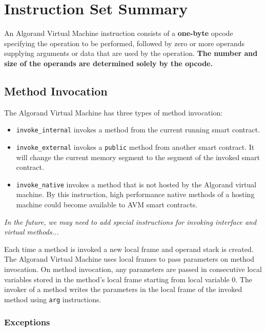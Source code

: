 \documentclass[11pt, A4]{report}
\begin{document}
    \section{Instruction Set Summary}\label{subsec:instruction-set-summary}

    An Algorand Virtual Machine instruction consists of a \textbf{one-byte} opcode specifying the operation to be
    performed, followed by zero or more operands supplying arguments or data that are used by the operation.
    \textbf{The number and size of the operands are determined solely by the opcode.}

    \subsection{Method Invocation}\label{subsec:method-invocation}

    The Algorand Virtual Machine has three types of method invocation:
    \begin{itemize}
        \item \texttt{invoke\_internal} invokes a method from the current running smart contract.
        \item \texttt{invoke\_external} invokes a \texttt{public} method from another smart contract. It will change
        the current memory segment to the segment of the invoked smart contract.
        \item \texttt{invoke\_native} invokes a method that is not hosted by the Algorand virtual machine. By this
        instruction, high performance native methods of a hosting machine could become available to AVM smart contracts.
    \end{itemize}

    \emph{In the future, we may need to add special instructions for invoking interface and virtual methods...}

    Each time a method is invoked a new local frame and operand stack is created. The Algorand Virtual Machine uses
    local frames to pass parameters on method invocation. On method invocation, any parameters are passed in
    consecutive local variables stored in the method's local frame starting from local variable 0. The invoker of a
    method writes the parameters in the local frame of the invoked method using \texttt{arg} instructions.

    \subsubsection{Exceptions}
\end{document}
